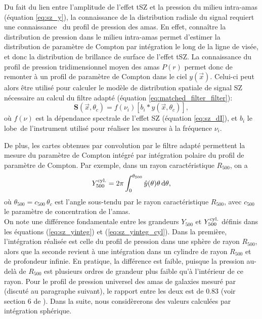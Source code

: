 Du fait du lien entre l'amplitude de l'effet tSZ et la pression du milieu intra-amas (équation \ref{eq:sz_y}), la connaissance de la distribution radiale du signal requiert une connaissance \prior\ du profil de pression des amas\footnotemark.
En effet, connaître la distribution de pression dans le milieu intra-amas permet d'estimer la distribution de paramètre de Compton par intégration le long de la ligne de visée, et donc la distribution de brillance de surface de l'effet tSZ.
La connaissance du profil de pression tridimensionnel moyen des amas $P(r)$ permet donc de remonter à un profil de paramètre de Compton dans le ciel $y(\vec{x})$.
Celui-ci peut alors être utilisé pour calculer le modèle de distribution spatiale de signal SZ nécessaire au calcul du filtre adapté (équation \ref{eq:matched_filter_filter}):
\begin{equation}
    \label{}
    \mathbf{S}(\vec{x}, \theta_c) = f(\nu_i) \left[ b_i \ast y(\vec{x}, \theta_c) \right],
\end{equation}
où $f(\nu)$ est la dépendance spectrale de l'effet SZ (équation \ref{eq:sz_dI}), et $b_i$ le lobe\footnotemark\ de l'instrument utilisé pour réaliser les mesures à la fréquence $\nu_i$.

De plus, les cartes obtenues par convolution par le filtre adapté permettent la mesure du paramètre de Compton intégré par intégration polaire du profil de paramètre de Compton.
Par exemple, dans un rayon caractéristique $R_{500}$, on a
\begin{equation}
    \label{eq:sz_yinteg_cyl}
    Y_{500}^{\rm cyl.} = 2\pi \int_0^{\theta_{500}} \hat{y}(\theta) \theta \, \mathrm{d}\theta,
\end{equation}
où $\theta_{500} = c_{500} \, \theta_c$ est l'angle sous-tendu par le rayon caractéristique $R_{500}$, avec $c_{500}$ le paramètre de concentration de l'amas. \\
On note une différence fondamentale entre les grandeurs $Y_{500}$ et $Y_{500}^{\rm cyl.}$ définis dans les équations (\ref{eq:sz_yinteg}) et (\ref{eq:sz_yinteg_cyl}).
Dans la première, l'intégration réalisée est celle du profil de pression dans une sphère de rayon $R_{500}$, alors que la seconde revient à une intégration dans un cylindre de rayon $R_{500}$ et de profondeur infinie.
En pratique, la différence est faible, puisque la pression au-delà de $R_{500}$ est plusieurs ordres de grandeur plus faible qu'à l'intérieur de ce rayon.
Pour le profil de pression universel des amas de galaxies mesuré par  (discuté au paragraphe suivant), le rapport entre les deux est de $0.83$ (voir section 6 de \cite{arnaud_universal_2010}).
Dans la suite, nous considèrerons des valeurs calculées par intégration sphérique.

